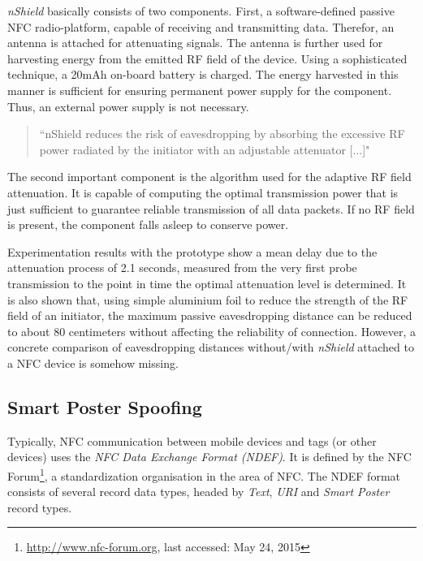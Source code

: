 \documentclass[12pt,a4paper]{article}
\begin{document}
\emph{nShield} basically consists of two components. First, a software-defined passive NFC radio-platform, capable of receiving and transmitting data. Therefor, an antenna is attached for attenuating signals. The antenna is further used for harvesting energy from the emitted RF field of the device. Using a sophisticated technique, a 20mAh on-board battery is charged. The energy harvested in this manner is sufficient for ensuring permanent power supply for the component. Thus, an external power supply is not necessary.

\begin{quote}
``nShield reduces the risk of eavesdropping by absorbing the excessive RF power radiated by the initiator with an adjustable attenuator [...]"\cite{DBLP:conf/mobisys/ZhouX14}
\end{quote}

The second important component is the algorithm used for the adaptive RF field attenuation. It is capable of computing the optimal transmission power that is just sufficient to guarantee reliable transmission of all data packets. If no RF field is present, the component falls asleep to conserve power.

Experimentation results with the prototype show a mean delay due to the attenuation process of 2.1 seconds, measured from the very first probe transmission to the point in time the optimal attenuation level is determined. It is also shown that, using simple aluminium foil to reduce the strength of the RF field of an initiator, the maximum passive eavesdropping distance can be reduced to about 80 centimeters without affecting the reliability of connection. However, a concrete comparison of eavesdropping distances without/with \emph{nShield} attached to a NFC device is somehow missing. 

\subsection{Smart Poster Spoofing}

Typically, NFC communication between mobile devices and tags (or other devices) uses the \emph{NFC Data Exchange Format (NDEF)}. It is defined by the NFC Forum\footnote{\url{http://www.nfc-forum.org}, last accessed: May 24, 2015}, a standardization organisation in the area of NFC. The NDEF format consists of several record data types, headed by \emph{Text}, \emph{URI} and \emph{Smart Poster} record types.\cite{DBLP:conf/IEEEares/Mulliner09}\cite{DBLP:conf/mobisys/GummesonPGTZ13}
\end{document}
